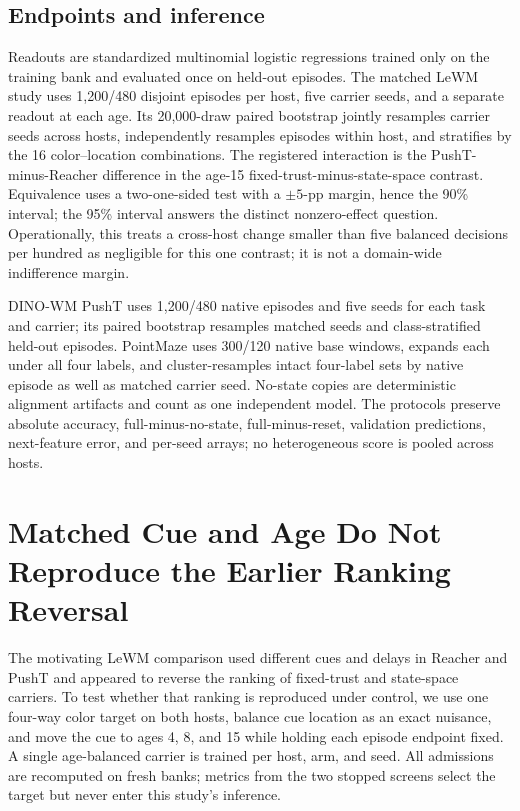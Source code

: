 \subsection{Endpoints and inference}

Readouts are standardized multinomial logistic regressions trained only on the
training bank and evaluated once on held-out episodes.  The matched LeWM study
uses 1,200/480 disjoint episodes per host, five carrier seeds, and a separate
readout at each age.  Its 20,000-draw paired bootstrap jointly resamples carrier
seeds across hosts, independently resamples episodes within host, and stratifies
by the 16 color--location combinations.  The registered interaction is the
PushT-minus-Reacher difference in the age-15 fixed-trust-minus-state-space
contrast.  Equivalence uses a two-one-sided test with a $\pm5$-pp margin, hence
the 90\% interval; the 95\% interval answers the distinct nonzero-effect
question.  Operationally, this treats a cross-host change smaller than five
balanced decisions per hundred as negligible for this one contrast; it is not a
domain-wide indifference margin.

DINO-WM PushT uses 1,200/480 native episodes and five seeds for each task
and carrier; its paired bootstrap resamples matched seeds and class-stratified
held-out episodes.  PointMaze uses 300/120 native base windows, expands
each under all four labels, and cluster-resamples intact four-label sets by
native episode as well as matched carrier seed.  No-state copies are
deterministic alignment artifacts and count as one independent model.  The
protocols preserve absolute accuracy, full-minus-no-state, full-minus-reset,
validation predictions, next-feature error, and per-seed arrays; no
heterogeneous score is pooled across hosts.

\section{Matched Cue and Age Do Not Reproduce the Earlier Ranking Reversal}

The motivating LeWM comparison used different cues and delays in Reacher and
PushT and appeared to reverse the ranking of fixed-trust and state-space
carriers.  To test whether that ranking is reproduced under control, we use one
four-way color target on both hosts, balance cue location as an exact nuisance,
and move the cue to ages 4, 8, and 15 while holding each episode endpoint fixed.
A single age-balanced carrier is trained per host, arm, and seed.  All
admissions are recomputed on fresh banks; metrics from the two stopped screens
select the target but never enter this study's inference.

